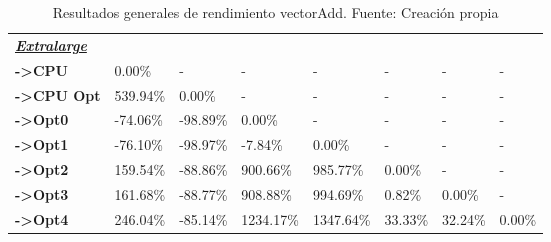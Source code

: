 \begin{table}[H]
\begin{tabular}{llllllll}
    \cellcolor[HTML]{DAE8FC} \textbf{\textbf{{\emph{{\underline{{Extralarge}}}}}}} &  &  &  &  &  &  &  \\
    \rowcolor[HTML]{EFEFEF} \cellcolor[HTML]{DAE8FC} \textbf{->CPU} & 0.00\% & - & - & - & - & - & - \\
    \cellcolor[HTML]{DAE8FC} \textbf{->CPU Opt} & 539.94\% & 0.00\% & - & - & - & - & - \\
    \rowcolor[HTML]{EFEFEF} \cellcolor[HTML]{DAE8FC} \textbf{->Opt0} & -74.06\% & -98.89\% & 0.00\% & - & - & - & - \\
    \cellcolor[HTML]{DAE8FC} \textbf{->Opt1} & -76.10\% & -98.97\% & -7.84\% & 0.00\% & - & - & - \\
    \rowcolor[HTML]{EFEFEF} \cellcolor[HTML]{DAE8FC} \textbf{->Opt2} & 159.54\% & -88.86\% & 900.66\% & 985.77\% & 0.00\% & - & - \\
    \cellcolor[HTML]{DAE8FC} \textbf{->Opt3} & 161.68\% & -88.77\% & 908.88\% & 994.69\% & 0.82\% & 	0.00\% & - \\
    \rowcolor[HTML]{EFEFEF} \cellcolor[HTML]{DAE8FC} \textbf{->Opt4} & 246.04\% & -85.14\% & 1234.17\% & 1347.64\% & 33.33\% & 	32.24\% & 	0.00\% \\
    \end{tabular}
    \caption[Resultados generales de rendimiento vectorAdd]{{Resultados generales de rendimiento vectorAdd. Fuente: Creación propia}}
    \label{table_global_vectorAdd_PerformanceResults_speedup}
\end{table}